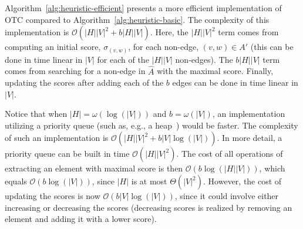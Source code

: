 \documentclass[twocolumn]{article}
\newcommand{\FA}{\widehat{A}}
\newcommand{\Hide}{H}
\begin{document}

Algorithm~\ref{alg:heuristic-efficient} presents a more efficient implementation of OTC compared to Algorithm~\ref{alg:heuristic-basic}. The complexity of this implementation is $\mathcal{O}(|\Hide||V|^2+b|\Hide||V|)$. Here, the $|\Hide||V|^2$ term comes from computing an initial score, $\sigma_{(v,w)}$, for each non-edge, $(v,w)\in A'$ (this can be done in time linear in $|V|$ for each of the $|\Hide||V|$ non-edges). The $b|\Hide||V|$ term comes from searching for a non-edge in $\FA$ with the maximal score. Finally, updating the scores after adding each of the $b$ edges can be done in time linear in $|V|$.

Notice that when $|\Hide|=\omega(\log(|V|))$ and $b = \omega(|V|)$, an implementation utilizing a priority queue (such as, e.g., a heap~\cite{thomas2001introduction}) would be faster. The complexity of such an implementation is $\mathcal{O}(|\Hide||V|^2+b|V|\log(|V|))$. In more detail, a priority queue can be built in time $\mathcal{O}(|\Hide||V|^2)$. The cost of all operations of extracting an element with maximal score is then $\mathcal{O}(b\log(|\Hide||V|))$, which equals $\mathcal{O}(b\log(|V|))$, since $|\Hide|$ is at most $\Theta(|V|^2)$. However, the cost of updating the scores is now $\mathcal{O}(b|V|\log(|V|))$, since it could involve either increasing or decreasing the scores (decreasing scores is realized by removing an element and adding it with a lower score).
\end{document}

